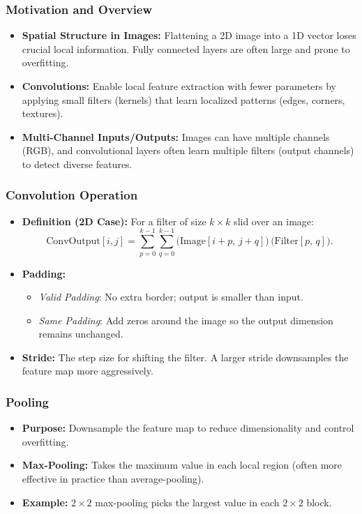 \documentclass{article}
\begin{document}
\subsubsection{Motivation and Overview}
\begin{itemize}
    \item \textbf{Spatial Structure in Images:} Flattening a 2D image into a 1D vector loses crucial local information. Fully connected layers are often large and prone to overfitting.
    \item \textbf{Convolutions:} Enable local feature extraction with fewer parameters by applying small filters (kernels) that learn localized patterns (edges, corners, textures).
    \item \textbf{Multi-Channel Inputs/Outputs:} Images can have multiple channels (RGB), and convolutional layers often learn multiple filters (output channels) to detect diverse features.
\end{itemize}

\subsubsection{Convolution Operation}
\begin{itemize}
    \item \textbf{Definition (2D Case):} For a filter of size $k \times k$ slid over an image:
    \[
    \text{ConvOutput}[i,j] 
    = \sum_{p=0}^{k-1} \sum_{q=0}^{k-1} \bigl(\text{Image}[i+p,\, j+q]\bigr)\,\bigl(\text{Filter}[p,\,q]\bigr).
    \]
    \item \textbf{Padding:} 
    \begin{itemize}
        \item \textit{Valid Padding}: No extra border; output is smaller than input.
        \item \textit{Same Padding}: Add zeros around the image so the output dimension remains unchanged.
    \end{itemize}
    \item \textbf{Stride:} The step size for shifting the filter. A larger stride downsamples the feature map more aggressively.
\end{itemize}

\subsubsection{Pooling}
\begin{itemize}
    \item \textbf{Purpose:} Downsample the feature map to reduce dimensionality and control overfitting.
    \item \textbf{Max-Pooling:} Takes the maximum value in each local region (often more effective in practice than average-pooling).
    \item \textbf{Example:} $2\times 2$ max-pooling picks the largest value in each $2\times 2$ block.
\end{itemize}
\end{document}
